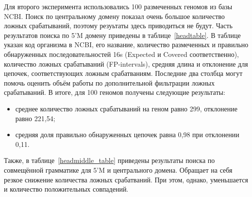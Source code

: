\documentclass[12pt]{article}  %
\theoremstyle{remark}
\begin{document}
Для второго эксперимента использовались 100 размеченных геномов из базы NCBI.
Поиск по центральному домену показал очень большое количество ложных срабатываний, поэтому резуьтаты здесь приводиться не будут.
Часть результатов поиска по 5'M домену приведены в таблице~\ref{headtable}. 
В таблице указан код организма в NCBI, его название, количество размеченных и правильно обнаруженных последовательностей 16s (Expected и Covered соответственно), количество ложных срабатываний (FP-intervals), средняя длина и отклонение для цепочек, соответствующих ложным срабатваниям.
Последние два столбца могут помочь оценить объём работы по дополнительной фильтрации ложных срабатываний.
В итоге, для 100 геномов получены следующие результаты:
\begin{itemize}
\item среднее количество ложных срабатываний на геном равно 299, отклонение равно 221,54;
\item средняя доля правильно обнаруженных цепочек равна 0,98 при отклонении 0,11.
\end{itemize}

Также, в таблице~\ref{headmiddle_table} приведены результаты поиска по совмещённой грамматике для 5'M и центрального домена.
Обращает на себя резкое снижение количества ложных срабатваний.
При этом, однако, уменьшается и количество положительных совпадений.
\end{document}
